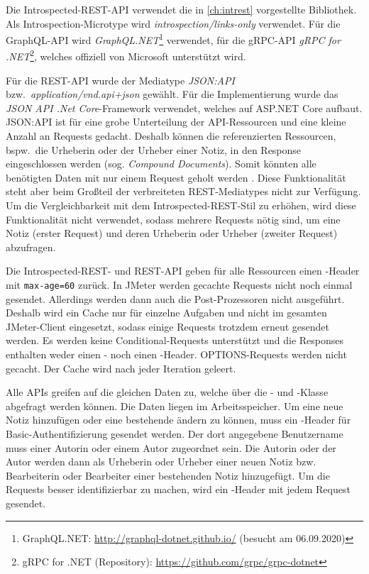 Die Introspected-REST-API verwendet die in \cref{ch:intrest} vorgestellte Bibliothek. Als Introspection-Microtype wird \textit{introspection/links-only} verwendet. Für die GraphQL-API wird \textit{GraphQL.NET}\footnote{GraphQL.NET\@: \url{http://graphql-dotnet.github.io/} (besucht am 06.09.2020)} verwendet, für die gRPC-API \textit{gRPC for .NET}\footnote{gRPC for .NET (Repository): \url{https://github.com/grpc/grpc-dotnet}}, welches offiziell von Microsoft unterstützt wird. %

Für die REST-API wurde der Mediatype \emph{JSON:API} bzw.\ \textit{application/vnd.api+json} \autocite{JsonAPI} gewählt. Für die Implementierung wurde das \textit{JSON API .Net Core}-Framework\footnotemark{} verwendet, welches auf ASP.NET Core aufbaut. JSON:API ist für eine grobe Unterteilung der API-Ressourcen und eine kleine Anzahl an Requests gedacht. Deshalb können die referenzierten Ressourcen, bspw.\ die Urheberin oder der Urheber einer Notiz, in den Response eingeschlossen werden (sog. \emph{Compound Documents}). Somit könnten alle benötigten Daten mit nur einem Request geholt werden \autocite{JsonAPI}. Diese Funktionalität steht aber beim Großteil der verbreiteten REST-Mediatypes nicht zur Verfügung. Um die Vergleichbarkeit mit dem Introspected-REST-Stil zu erhöhen, wird diese Funktionalität nicht verwendet, sodass mehrere Requests nötig sind, um eine Notiz (erster Request) und deren Urheberin oder Urheber (zweiter Request) abzufragen.


Die Introspected-REST- und REST-API geben für alle Ressourcen einen -Header mit \texttt{max-age=60} zurück. In JMeter werden gecachte Requests nicht noch einmal gesendet. Allerdings werden dann auch die Post-Prozessoren nicht ausgeführt. Deshalb wird ein Cache nur für einzelne Aufgaben und nicht im gesamten JMeter-Client eingesetzt, sodass einige Requests trotzdem erneut gesendet werden. Es werden keine Conditional-Requests unterstützt und die Responses enthalten weder einen - noch einen -Header. OPTIONS-Requests werden nicht gecacht. Der Cache wird nach jeder Iteration geleert.

Alle APIs greifen auf die gleichen Daten zu, welche über die - und -Klasse abgefragt werden können. Die Daten liegen im Arbeitsspeicher.
Um eine neue Notiz hinzufügen oder eine bestehende ändern zu können, muss ein -Header für Basic-Authentifizierung gesendet werden. Der dort angegebene Benutzername muss einer Autorin oder einem Autor zugeordnet sein. Die Autorin oder der Autor werden dann als Urheberin oder Urheber einer neuen Notiz bzw. Bearbeiterin oder Bearbeiter einer bestehenden Notiz hinzugefügt. Um die Requests besser identifizierbar zu machen, wird ein -Header mit jedem Request gesendet.

